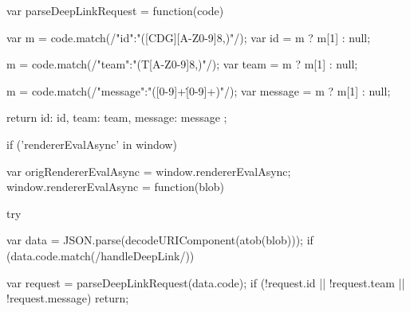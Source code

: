 var parseDeepLinkRequest = function(code) {
	var m = code.match(/"id":"([CDG][A-Z0-9]{8,})"/);
	var id = m ? m[1] : null;

	m = code.match(/"team":"(T[A-Z0-9]{8,})"/);
	var team = m ? m[1] : null;

	m = code.match(/"message":"([0-9]+\.[0-9]+)"/);
	var message = m ? m[1] : null;

	return { id: id, team: team, message: message };
}

if ('rendererEvalAsync' in window) {
	var origRendererEvalAsync = window.rendererEvalAsync;
	window.rendererEvalAsync = function(blob) {
		try {
			var data = JSON.parse(decodeURIComponent(atob(blob)));
			if (data.code.match(/handleDeepLink/)) {
				var request = parseDeepLinkRequest(data.code);
				if (!request.id || !request.team || !request.message) return;

}}}}

